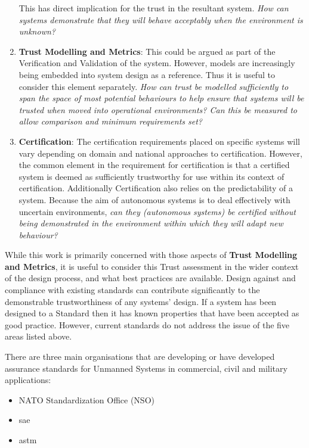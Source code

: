 \begin{enumerate}
    This has direct implication for the trust in the resultant system.
    \emph{How can systems demonstrate that they will behave acceptably when the environment is unknown?}
  \item \textbf{Trust Modelling and Metrics}: This could be argued as part of the Verification and Validation of the system.
    However, models are increasingly being embedded into system design as a reference.
    Thus it is useful to consider this element separately.
    \textit{How can trust be modelled sufficiently to span the space of most potential behaviours to help ensure that systems will be trusted when moved into operational environments?
    Can this be measured to allow comparison and minimum requirements set?}
  \item \textbf{Certification}: The certification requirements placed on specific systems will vary depending on domain and national approaches to certification.
    However, the common element in the requirement for certification is that a certified system is deemed as sufficiently trustworthy for use within its context of certification.
    Additionally Certification also relies on the predictability of a system.
    Because the aim of autonomous systems is to deal effectively with uncertain environments, \textit{can they (autonomous systems) be certified without being demonstrated in the environment within which they will adapt new behaviour?}
\end{enumerate}

While this work is primarily concerned with those aspects of \textbf{Trust Modelling and Metrics}, it is useful to consider this Trust assessment in the wider context of the design process, and what best practices are available.
Design against and compliance with existing standards can contribute significantly to the demonstrable trustworthiness of any systems’ design.
If a system has been designed to a Standard then it has known properties that have been accepted as good practice.
However, current standards do not address the issue of the five areas listed above.

There are three main organisations that are developing or have developed assurance standards for Unmanned Systems in commercial, civil and military applications:

\begin{itemize}
  \item NATO Standardization Office (NSO)
  \item \acrfull{sae}
  \item \acrfull{astm}
\end{itemize}

